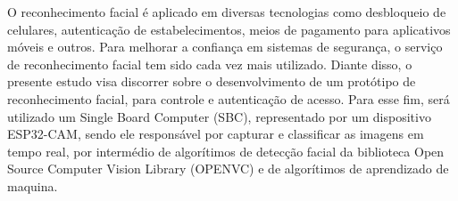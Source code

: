 
\begin{resumoutfpr}%
    O reconhecimento facial é aplicado em diversas tecnologias como desbloqueio de celulares, autenticação de estabelecimentos, meios de pagamento para aplicativos móveis e outros. Para melhorar a confiança em sistemas de segurança, o serviço de reconhecimento facial tem sido cada vez mais utilizado.  Diante disso, o presente estudo visa discorrer sobre o desenvolvimento de um protótipo de reconhecimento facial, para controle e autenticação de acesso. Para esse fim, será utilizado um Single Board Computer (SBC), representado por um dispositivo ESP32-CAM, sendo ele responsável por capturar e classificar as imagens em tempo real, por intermédio de algorítimos de detecção facial da biblioteca Open Source Computer Vision Library (OPENVC) e de algorítimos de aprendizado de maquina.
\end{resumoutfpr}
